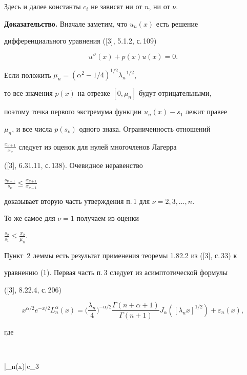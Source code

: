Здесь и далее константы $c_i$ не зависят ни от $n$, ни от $\nu$.





{\bf Доказательство.} Вначале заметим, что $u_n(x)$ есть решение


дифференциального уравнения ([3], 5.1.2, с.\,109)


\begin{equation}


u''(x)+p(x)u(x)=0.


\end{equation} 


Если положить $\mu_n=({\alpha^2}-1/4)^{1/2}\lambda_n^{-1/2}$,


то все значения $p(x)$ на отрезке $[0,\mu_n]$ будут отрицательными,


поэтому точка первого экстремума функции $u_n(x)-s_1$ лежит правее


$\mu_n$, и все числа $p(s_\nu)$ одного знака. Ограниченность отношений


$\frac{x_{\nu+1}}{x_\nu}$ следует из оценок для нулей многочленов Лагерра


([3], 6.31.11, с.\,138). Очевидное неравенство 


$\frac{s_{\nu+1}}{s_\nu}\leq\frac{x_{\nu+1}}{x_{\nu-1}}$


доказывает вторую часть утверждения п.\,1 для $\nu=2,3,\dotsc, n$.


То же самое для $\nu=1$ получаем из оценки


$\frac{s_2}{s_1}\leq\frac{x_2}{\mu_n}$. 


Пункт~2 леммы есть результат применения теоремы 1.82.2 из ([3], с.\,33) к


уравнению (1). Первая часть п.\,3 следует из асимптотической формулы 


([3], 8.22.4, с.\,206)


\begin{equation}


x^{\alpha/2}e^{-x/2}L^\alpha_n(x)=


\bigg(\frac{\lambda_n}{4}\bigg)^{-\alpha/2}


\frac{\Gamma(n+\alpha+1)}{\Gamma(n+1)}J_\alpha([{\lambda_n}x]^{1/2})+


\varepsilon_n(x),


\end{equation}


где


$$


|\varepsilon_n(x)|\leq c_3


